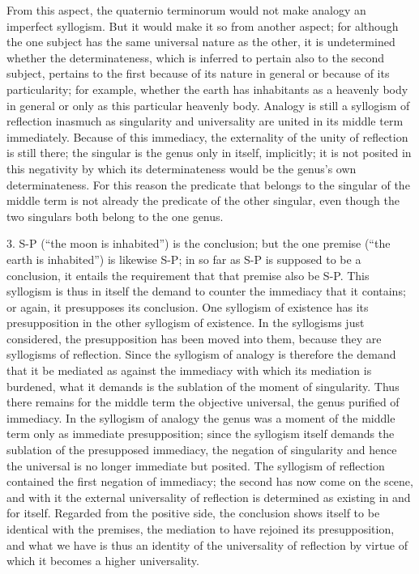 From this aspect, the quaternio terminorum would not make analogy
an imperfect syllogism.
But it would make it so from another aspect;
for although the one subject has
the same universal nature as the other,
it is undetermined whether the determinateness,
which is inferred to pertain also to the second subject,
pertains to the first because of its nature in general
or because of its particularity;
for example, whether the earth has inhabitants
as a heavenly body in general
or only as this particular heavenly body.
Analogy is still a syllogism of reflection
inasmuch as singularity and universality
are united in its middle term immediately.
Because of this immediacy, the externality of
the unity of reflection is still there;
the singular is the genus only in itself, implicitly;
it is not posited in this negativity
by which its determinateness would be
the genus's own determinateness.
For this reason the predicate that belongs
to the singular of the middle term
is not already the predicate of the other singular,
even though the two singulars both belong to the one genus.

3. S-P (“the moon is inhabited”) is the conclusion;
but the one premise (“the earth is inhabited”) is likewise S-P;
in so far as S-P is supposed to be a conclusion,
it entails the requirement that that premise also be S-P.
This syllogism is thus in itself the demand
to counter the immediacy that it contains;
or again, it presupposes its conclusion.
One syllogism of existence has its presupposition
in the other syllogism of existence.
In the syllogisms just considered,
the presupposition has been moved into them,
because they are syllogisms of reflection.
Since the syllogism of analogy is therefore
the demand that it be mediated as against the immediacy
with which its mediation is burdened,
what it demands is the sublation of the moment of singularity.
Thus there remains for the middle term the objective universal,
the genus purified of immediacy.
In the syllogism of analogy the genus was
a moment of the middle term
only as immediate presupposition;
since the syllogism itself demands
the sublation of the presupposed immediacy,
the negation of singularity and hence the universal is
no longer immediate but posited.
The syllogism of reflection contained
the first negation of immediacy;
the second has now come on the scene,
and with it the external universality of reflection is
determined as existing in and for itself.
Regarded from the positive side,
the conclusion shows itself to be
identical with the premises,
the mediation to have rejoined its presupposition,
and what we have is thus an identity of
the universality of reflection
by virtue of which it becomes
a higher universality.

